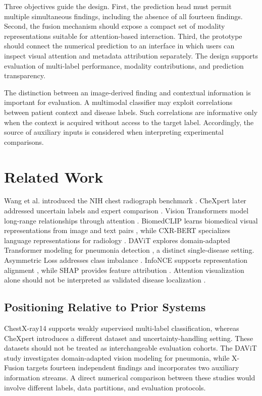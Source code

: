 \documentclass[conference,letterpaper]{IEEEtran}
\begin{document}
Three objectives guide the design. First, the prediction head must permit multiple simultaneous findings, including the absence of all fourteen findings. Second, the fusion mechanism should expose a compact set of modality representations suitable for attention-based interaction. Third, the prototype should connect the numerical prediction to an interface in which users can inspect visual attention and metadata attribution separately. The design supports evaluation of multi-label performance, modality contributions, and prediction transparency.

The distinction between an image-derived finding and contextual information is important for evaluation. A multimodal classifier may exploit correlations between patient context and disease labels. Such correlations are informative only when the context is acquired without access to the target label. Accordingly, the source of auxiliary inputs is considered when interpreting experimental comparisons.

\section{Related Work}

Wang et al. introduced the NIH chest radiograph benchmark \cite{wang2017}. CheXpert later addressed uncertain labels and expert comparison \cite{irvin2019}. Vision Transformers model long-range relationships through attention \cite{dosovitskiy2021,vaswani2017}. BiomedCLIP learns biomedical visual representations from image and text pairs \cite{biomedclip2023}, while CXR-BERT specializes language representations for radiology \cite{cxrbert2022}. DAViT explores domain-adapted Transformer modeling for pneumonia detection \cite{davit2025}, a distinct single-disease setting. Asymmetric Loss addresses class imbalance \cite{ridnik2021}. InfoNCE supports representation alignment \cite{oord2018}, while SHAP provides feature attribution \cite{lundberg2017}. Attention visualization alone should not be interpreted as validated disease localization \cite{chefer2021}.

\subsection{Positioning Relative to Prior Systems}

ChestX-ray14 supports weakly supervised multi-label classification, whereas CheXpert introduces a different dataset and uncertainty-handling setting. These datasets should not be treated as interchangeable evaluation cohorts. The DAViT study investigates domain-adapted vision modeling for pneumonia, while X-Fusion targets fourteen independent findings and incorporates two auxiliary information streams. A direct numerical comparison between these studies would involve different labels, data partitions, and evaluation protocols.
\end{document}

